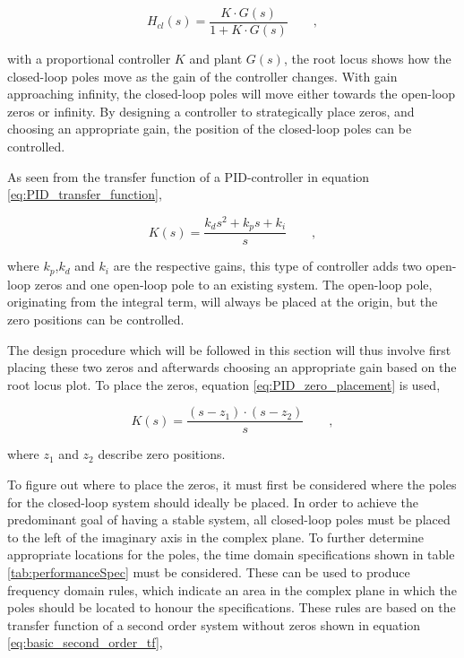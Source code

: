 \documentclass[../../main.tex]{subfiles}
\begin{document}
\begin{equation}\label{eq:closedLoopSystem}
    H_{cl}(s)=\frac{K\cdot G(s)}{1+K\cdot G(s)} \qquad ,
\end{equation}

with a proportional controller $K$ and plant $G(s)$, the root locus shows how the closed-loop poles move as the gain of the controller changes. With gain approaching infinity, the closed-loop poles will move either towards the open-loop zeros or infinity. By designing a controller to strategically place zeros, and choosing an appropriate gain, the position of the closed-loop poles can be controlled.

As seen from the transfer function of a PID-controller in equation \ref{eq:PID_transfer_function},

\begin{equation}\label{eq:PID_transfer_function}
    K(s) = \frac{k_d s^2 + k_p s + k_i}{s} \qquad ,
\end{equation}

where $k_p$,$k_d$ and $k_i$ are the respective gains, this type of controller adds two open-loop zeros and one open-loop pole to an existing system. The open-loop pole, originating from the integral term, will always be placed at the origin, but the zero positions can be controlled.

The design procedure which will be followed in this section will thus involve first placing these two zeros and afterwards choosing an appropriate gain based on the root locus plot. To place the zeros, equation \ref{eq:PID_zero_placement} is used, 

\begin{equation}\label{eq:PID_zero_placement}
    K(s) = \frac{(s-z_1)\cdot(s-z_2)}{s} \qquad ,
\end{equation}

where $z_1$ and $z_2$ describe zero positions.

To figure out where to place the zeros, it must first be considered where the poles for the closed-loop system should ideally be placed. In order to achieve the predominant goal of having a stable system, all closed-loop poles must be placed to the left of the imaginary axis in the complex plane. To further determine appropriate locations for the poles, the time domain specifications shown in table \ref{tab:performanceSpec} must be considered. These can be used to produce frequency domain rules, which indicate an area in the complex plane in which the poles should be located to honour the specifications. These rules are based on the transfer function of a second order system without zeros shown in equation \ref{eq:basic_second_order_tf},
\end{document}
